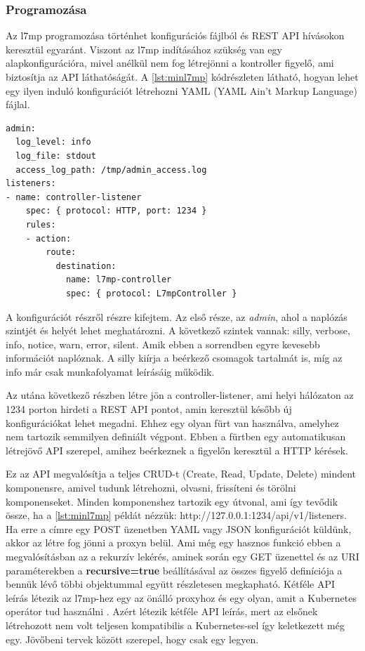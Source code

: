 \subsubsection{Programozása}

Az l7mp programozása történhet konfigurációs fájlból és REST API hívásokon keresztül
egyaránt. Viszont az l7mp indításához szükség van egy alapkonfigurációra, mivel
anélkül nem fog létrejönni a kontroller figyelő, ami biztosítja az API 
láthatóságát. A \ref{lst:minl7mp} kódrészleten látható, hogyan lehet egy ilyen induló konfigurációt
létrehozni YAML (YAML Ain't Markup Language) fájlal.

\begin{lstlisting}[caption=L7mp minimális konfiguráció, label=lst:minl7mp]
admin:
  log_level: info
  log_file: stdout
  access_log_path: /tmp/admin_access.log
listeners:
- name: controller-listener
	spec: { protocol: HTTP, port: 1234 }
	rules:
    - action:
        route:
          destination:
            name: l7mp-controller
            spec: { protocol: L7mpController }
\end{lstlisting}

A konfigurációt részről részre kifejtem. Az első része, az \textit{admin}, ahol
a naplózás szintjét és helyét lehet meghatározni. A következő szintek vannak:
silly, verbose, info, notice, warn, error, silent. Amik ebben a sorrendben
egyre kevesebb információt naplóznak. A silly kiírja a beérkező csomagok tartalmát
is, míg az info már csak munkafolyamat leírásáig működik.

Az utána következő részben létre jön a controller-listener, ami helyi hálózaton az 
1234 porton hirdeti a REST API pontot, amin keresztül később új konfigurációkat lehet 
megadni. Ehhez egy olyan fürt van használva, amelyhez nem tartozik semmilyen definiált
végpont. Ebben a fürtben egy automatikusan létrejövő API szerepel, amihez beérkeznek 
a figyelőn keresztül a HTTP kérések. 

Ez az API megvalósítja a teljes CRUD-t (Create, Read, Update, Delete) mindent komponensre, 
amivel tudunk létrehozni, olvasni, frissíteni és törölni komponenseket. Minden komponenshez
tartozik egy útvonal, ami így tevődik össze, ha a \ref{lst:minl7mp} példát nézzük: http://127.0.0.1:1234/api/v1/listeners.
Ha erre a címre egy POST üzenetben YAML vagy 
JSON konfigurációt küldünk, akkor az létre fog jönni a proxyn belül. Ami még egy 
hasznos funkció ebben a megvalósításban az a rekurzív lekérés, aminek során egy GET 
üzenettel és az URI paraméterekben a \textbf{recursive=true} beállításával az összes
figyelő definíciója a bennük lévő többi objektummal együtt részletesen megkapható. Kétféle 
API leírás létezik az l7mp-hez egy az önálló proxyhoz \cite{proxy} és egy olyan, amit a 
Kubernetes operátor tud használni \cite{kubeProxy}. Azért létezik kétféle API leírás,
mert az elsőnek létrehozott nem volt teljesen kompatibilis a Kubernetes-sel így 
keletkezett még egy. Jövőbeni tervek között szerepel, hogy csak egy legyen.

